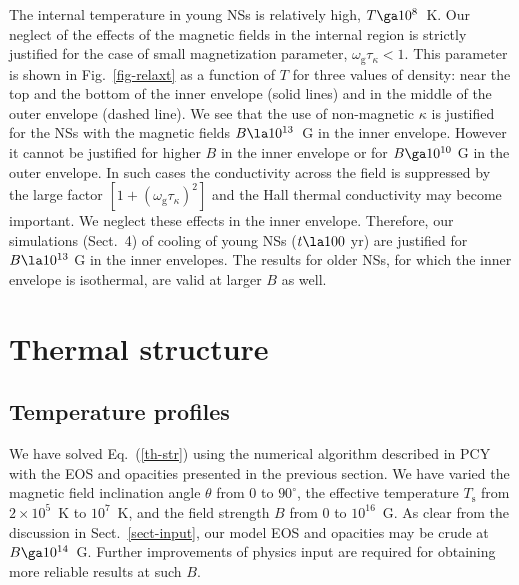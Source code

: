 \documentclass{aa}
\begin{document}
The internal temperature in young NSs
is relatively high, $T \ga 10^8$~K.
Our neglect of the effects of the magnetic fields
in the internal region
is strictly justified for the case of small
magnetization parameter, $\omega_\mathrm{g} \tau_\kappa<1$.
This parameter
is shown in Fig.~\ref{fig-relaxt} as a function of $T$
for three values of density: near the top 
and the bottom of the inner envelope (solid lines) and in
the middle of the outer envelope (dashed line).
We see that the use of non-magnetic $\kappa$
is justified for the NSs with the
magnetic fields $B\la10^{13}$~G in the inner envelope.
However it cannot be justified
for higher $B$ in the inner envelope or
for $B \ga 10^{10}$ G in the outer envelope.
In such cases the conductivity
across the field is suppressed by the large factor
$[1+(\omega_\mathrm{g} \tau_\kappa)^2]$ and
the Hall thermal conductivity may become important.
We neglect these effects in the inner envelope.
Therefore, our simulations
(Sect.\ 4) of cooling of young NSs ($t \la 100$ yr)
are justified for $B \la 10^{13}$ G
in the inner envelopes. The results for older NSs,
for which the inner envelope is isothermal,
are valid at larger $B$ as well.

\section{Thermal structure}
\label{sect-thst}
%

\subsection{Temperature profiles}
\label{sect-profiles}
%
We have solved Eq.~(\ref{th-str}) using the numerical algorithm
described in PCY with the EOS and opacities
presented in the previous section. 
We have varied the magnetic field
inclination angle $\theta$ from 0 to $90^\circ$,
the effective temperature $T_\mathrm{s}$ from $2\times10^5$~K
to $10^7$~K,
and the field strength $B$ from 0 to $10^{16}$~G.
As clear from the discussion in Sect.\ \ref{sect-input},
our model EOS and opacities
may be crude at $B \ga 10^{14}$~G.
Further improvements of physics input are required
for obtaining more reliable results at such $B$.
\end{document}
